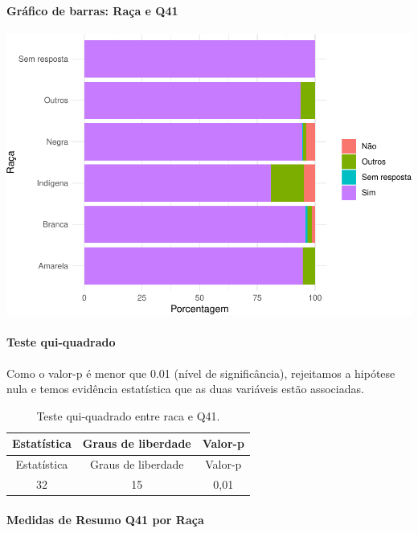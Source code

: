 \documentclass[]{article}
\let\oldparagraph\paragraph
\renewcommand{\paragraph}[1]{\oldparagraph{#1}\mbox{}}
\begin{document}
\hypertarget{gruxe1fico-de-barras-rauxe7a-e-q41}{%
\paragraph{Gráfico de barras: Raça e Q41}\label{gruxe1fico-de-barras-rauxe7a-e-q41}}

\begin{center}\includegraphics[width=0.75\linewidth]{relatorio_covid19_files/figure-latex/unnamed-chunk-1637-1} \end{center}

\hypertarget{teste-qui-quadrado-140}{%
\paragraph{Teste qui-quadrado}\label{teste-qui-quadrado-140}}

Como o valor-p é menor que 0.01 (nível de significância), rejeitamos a hipótese nula e temos evidência estatística que as duas variáveis estão associadas.

\begin{longtable}[]{@{}ccc@{}}
\caption{\label{tab:unnamed-chunk-1639}Teste qui-quadrado entre raca e Q41.}\tabularnewline
\toprule
Estatística & Graus de liberdade & Valor-p\tabularnewline
\midrule
\endfirsthead
\toprule
Estatística & Graus de liberdade & Valor-p\tabularnewline
\midrule
\endhead
32 & 15 & 0,01\tabularnewline
\bottomrule
\end{longtable}

\cleardoublepage

\hypertarget{medidas-de-resumo-q41-por-rauxe7a}{%
\paragraph{Medidas de Resumo Q41 por Raça}\label{medidas-de-resumo-q41-por-rauxe7a}}
\end{document}

